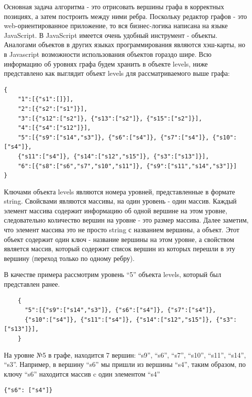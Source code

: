 Основная задача алгоритма - это отрисовать вершины графа в корректных позициях, а затем построить между ними ребра. Поскольку редактор графов - это web-ориентированное приложение, то вся бизнес-логика написана на языке JavaScript. В JavaScript имеется очень удобный инструмент - объекты. Аналогами объектов в других языках программирования являются хэш-карты, но в Javascript возможности использования объектов гораздо шире. Всю информацию об уровнях графа будем хранить в объекте levels, ниже представлено как выглядит объект levels для рассматриваемого выше графа:

\begin{verbatim}
{
	"1":[{"s1":[]}],
	"2":[{"s2":["s1"]}],
	"3":[{"s12":["s2"]}, {"s13":["s2"]}, {"s15":["s2"]}],
	"4":[{"s4":["s12"]}],
	"5":[{"s9":["s14","s3"]}, {"s6":["s4"]}, {"s7":["s4"]}, {"s10":["s4"]}, 
	{"s11":["s4"]},	{"s14":["s12","s15"]}, {"s3":["s13"]}],
	"6":[{"s8":["s6","s7","s10","s11"]}, {"s9":["s11","s14","s3"]}]
}
\end{verbatim}

Ключами объекта levels являются номера уровней, представленные в формате string. Свойсвами являются массивы, на один уровень - один массив. Каждый элемент массива содержит информацию об одной вершине на этом уровне, следовательно количество вершин на уровне - это размер массива. Далее заметим, что элемент массива это не просто string с названием вершины, а объект. Этот объект содержит один ключ - название вершины на этом уровне, а свойством является массив, который содержит список вершин из которых перешли в эту вершину (переход только по одному ребру).

В качестве примера рассмотрим уровень ``5'' объекта levels, который был представлен ранее.


\begin{minipage}{0.5\textwidth}
	\begin{verbatim}
	{
	  "5":[{"s9":["s14","s3"]}, {"s6":["s4"]}, {"s7":["s4"]}, 
	  {"s10":["s4"]}, {"s11":["s4"]}, {"s14":["s12","s15"]}, {"s3":["s13"]}],
	}
	\end{verbatim}
\end{minipage}


На уровне №5 в графе, находится 7 вершин: ``s9'', ``s6'', ``s7'', ``s10'', ``s11'', ``s14'', ``s3''. Например, в вершину ``s6'' мы пришли из вершины ``s4'', таким образом, по ключу ``s6'' находится массив c один элементом ``s4''
\begin{verbatim}
{"s6": ["s4"]}
\end{verbatim}


